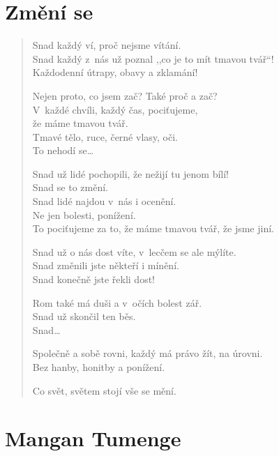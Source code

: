 
\section{Změní se}

\begin{verse}
Snad každý ví, proč nejsme vítání. \\
Snad každý z nás už poznal ,,co je to mít tmavou tvář``! \\
Každodenní útrapy, obavy a zklamání!

\medskip

Nejen proto, co jsem zač? Také proč a zač? \\
V každé chvíli, každý čas, pociťujeme, \\
\hspace{\fill}že máme tmavou tvář. \\
Tmavé tělo, ruce, černé vlasy, oči. \\
To nehodí se\ldots

\medskip

Snad už lidé pochopili, že nežijí tu jenom bílí! \\
Snad se to změní. \\
Snad lidé najdou v nás i ocenění. \\
Ne jen bolesti, ponížení. \\
To pociťujeme za to, že máme tmavou tvář, že jsme jiní.

\medskip

Snad už o nás dost víte, v lecčem se ale mýlíte. \\
Snad změnili jste někteří i mínění. \\
Snad konečně jste řekli dost!

\medskip

Rom také má duši a v očích bolest zář. \\
Snad už  skončil ten běs. \\
Snad\ldots

\medskip

Společně a sobě rovni, každý má právo žít, na úrovni. \\
Bez hanby, honitby a ponížení.

\medskip

Co svět,  světem stojí vše se mění.
\end{verse}


\section{Mangan Tumenge}

